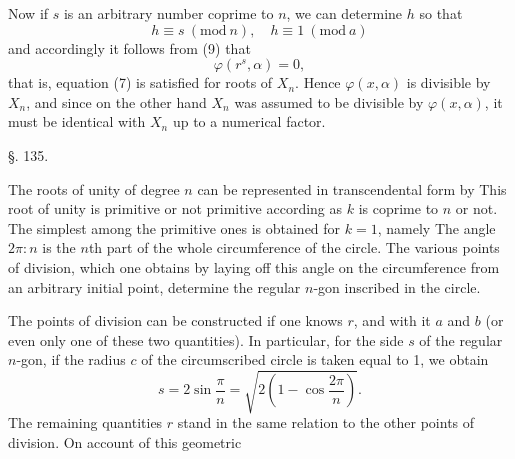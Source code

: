
Now if $s$ is an arbitrary number coprime to $n$, we can determine $h$ so that
\[
h \equiv s \ (\mathrm{mod}\ n), \quad h \equiv 1 \ (\mathrm{mod}\ a)
\]
and accordingly it follows from (9) that
\[
\varphi(r^s, \alpha) = 0,
\]
that is, equation (7) is satisfied for  roots of $X_n$. Hence $\varphi(x,\alpha)$ is divisible by $X_n$, and since on the other hand $X_n$ was assumed to be divisible by $\varphi(x,\alpha)$, it must be identical with $X_n$ up to a numerical factor.

\begin{center}
§. 135.

\end{center}

The roots of unity of degree $n$ can be represented in transcendental form by
This root of unity is primitive or not primitive according as $k$ is coprime to $n$ or not. The simplest among the primitive ones is obtained for $k = 1$, namely
The angle $2\pi : n$ is the $n$th part of the whole circumference of the circle. The various points of division, which one obtains by laying off this angle on the circumference from an arbitrary initial point, determine the regular $n$-gon inscribed in the circle.


The points of division can be constructed if one knows $r$, and with it $a$ and $b$ (or even only one of these two quantities). In particular, for the side $s$ of the regular $n$-gon, if the radius $c$ of the circumscribed circle is taken equal to 1, we obtain
\[
s = 2 \sin\frac{\pi}{n} = \sqrt{2\left(1 - \cos\frac{2\pi}{n}\right)}.
\]
The remaining quantities $r$ stand in the same relation to the other points of division. On account of this geometric
